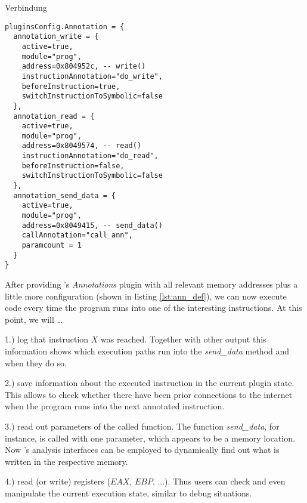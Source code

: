 Verbindung

\bigskip
\begin{lstlisting}[language={[5.0]Lua}, basicstyle=\ttfamily\footnotesize, caption={Configuration of the \textit{Annotations} plugin (part). Defines the instructions to be monitored and actions to trigger upon execution of these instructions. Note the link to the binary in listing \ref{lst:ass} via memory addresses.}, label={lst:ann_def}]
pluginsConfig.Annotation = {
  annotation_write = {
    active=true,
    module="prog",
    address=0x804952c, -- write()
    instructionAnnotation="do_write",
    beforeInstruction=true,
    switchInstructionToSymbolic=false
  },
  annotation_read = {
    active=true,
    module="prog",
    address=0x8049574, -- read()
    instructionAnnotation="do_read",
    beforeInstruction=false, 
    switchInstructionToSymbolic=false
  },
  annotation_send_data = {
    active=true,
    module="prog",
    address=0x8049415, -- send_data()
    callAnnotation="call_ann",
    paramcount = 1
  }
}
\end{lstlisting}
\bigskip


After providing \sse's \textit{Annotations} plugin with all relevant memory addresses plus a little more configuration (shown in listing \ref{lst:ann_def}), we can now execute code every time the program runs into one of the interesting instructions.
At this point, we will \ldots

1.) log that instruction $X$ was reached.
Together with other \sse output this information shows which execution paths run into the \textit{send\_data} method and when they do so.

2.) save information about the executed instruction in the current plugin state.
This allows to check whether there have been prior connections to the internet when the program runs into the next annotated instruction.

3.) read out parameters of the called function.
The function \textit{send\_data}, for instance, is called with one parameter, which appears to be a memory location.
Now \sse's analysis interfaces can be employed to dynamically find out what is written in the respective memory.

4.) read (or write) registers ($EAX$, $EBP$, ...).
Thus \sse users can check and even manipulate the current execution state, similar to debug situations.

